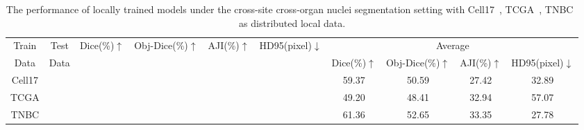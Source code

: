 \documentclass[letterpaper]{article} %
\begin{document}
\begin{table}
\centering
\scalebox{0.9}
{
\begin{tabular}{cccccc|cccc}
\toprule
Train
&Test   &\multirow{2}{*}{Dice(\%)$\uparrow$} &\multirow{2}{*}{Obj-Dice(\%)$\uparrow$} &\multirow{2}{*}{{AJI(\%)$\uparrow$}} &\multirow{2}{*}{HD95(pixel)$\downarrow$} &\multicolumn{4}{c}{Average}\\
Data &Data & & & &  &Dice(\%)$\uparrow$ &{Obj-Dice(\%)$\uparrow$} &{AJI(\%)$\uparrow$} &HD95(pixel)$\downarrow$\\
\midrule
\multirow{3}{*}{Cell17}  &\cellcolor{gray0}{Cell17} &\cellcolor{gray0}{85.90} &\cellcolor{gray0}{67.24} &\cellcolor{gray0}{44.26} &\cellcolor{gray0}{8.21} &\multirow{3}{*}{59.37}  &\multirow{3}{*}{50.59} &\multirow{3}{*}{27.42}  &\multirow{3}{*}{32.89}\\
&\cellcolor{gray1}{TCGA} &\cellcolor{gray1}{43.03} &\cellcolor{gray1}{33.83} &\cellcolor{gray1}{11.75} &\cellcolor{gray1}{34.75} & & &  \\
&\cellcolor{gray2}{TNBC} &\cellcolor{gray2}{49.18} &\cellcolor{gray2}{50.70} &\cellcolor{gray2}{26.26} &\cellcolor{gray2}{55.71} & & &  \\ \midrule
\multirow{3}{*}{TCGA}   &\cellcolor{gray0}{Cell17} &\cellcolor{gray0}{55.10} &\cellcolor{gray0}{48.25} &\cellcolor{gray0}{29.42} &\cellcolor{gray0}{31.94} &\multirow{3}{*}{49.20}  &\multirow{3}{*}{48.41} &\multirow{3}{*}{32.94} &\multirow{3}{*}{57.07}  \\
&\cellcolor{gray1}{TCGA} &\cellcolor{gray1}{75.75} &\cellcolor{gray1}{71.58} &\cellcolor{gray1}{51.91} &\cellcolor{gray1}{13.14} & & &  \\
&\cellcolor{gray2}{TNBC}  &\cellcolor{gray2}{16.77} &\cellcolor{gray2}{25.42} &\cellcolor{gray2}{7.50} &\cellcolor{gray2}{126.14} & & &  \\ \midrule
\multirow{3}{*}{TNBC} &\cellcolor{gray0}{Cell17} &\cellcolor{gray0}{70.42} &\cellcolor{gray0}{56.79} &\cellcolor{gray0}{36.59} &\cellcolor{gray0}{24.33} &\multirow{3}{*}{61.36}  &\multirow{3}{*}{52.65} &\multirow{3}{*}{33.35} &\multirow{3}{*}{27.78} \\
&\cellcolor{gray1}{TCGA} &\cellcolor{gray1}{35.59} &\cellcolor{gray1}{24.32} &\cellcolor{gray1}{5.65} &\cellcolor{gray1}{35.31} & & &  \\
&\cellcolor{gray2}{TNBC} &\cellcolor{gray2}{78.08} &\cellcolor{gray2}{76.84} &\cellcolor{gray2}{57.81} &\cellcolor{gray2}{23.72} & & &  \\
\bottomrule
\end{tabular}}
\caption{The performance of locally trained models under the cross-site cross-organ nuclei segmentation setting with Cell17~\cite{vu2019methods}, TCGA~\cite{kumar2017dataset}, TNBC~\cite{naylor2018segmentation} as distributed local data.
}
\label{tab:nucleis2}
\end{table}
\end{document}
